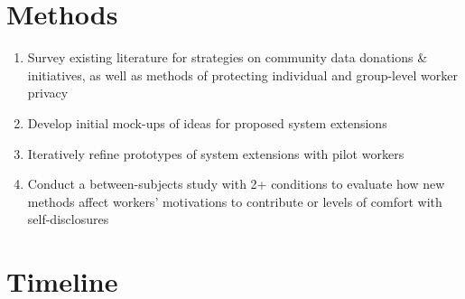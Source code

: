 \section{Methods}
\begin{enumerate}
    \item Survey existing literature for strategies on community data donations \& initiatives, as well as methods of protecting individual and group-level worker privacy
    \item Develop initial mock-ups of ideas for proposed system extensions 
    \item Iteratively refine prototypes of system extensions with pilot workers
    \item Conduct a between-subjects study with 2+ conditions to evaluate how new methods affect workers' motivations to contribute or levels of comfort with self-disclosures
\end{enumerate}

\section{Timeline}